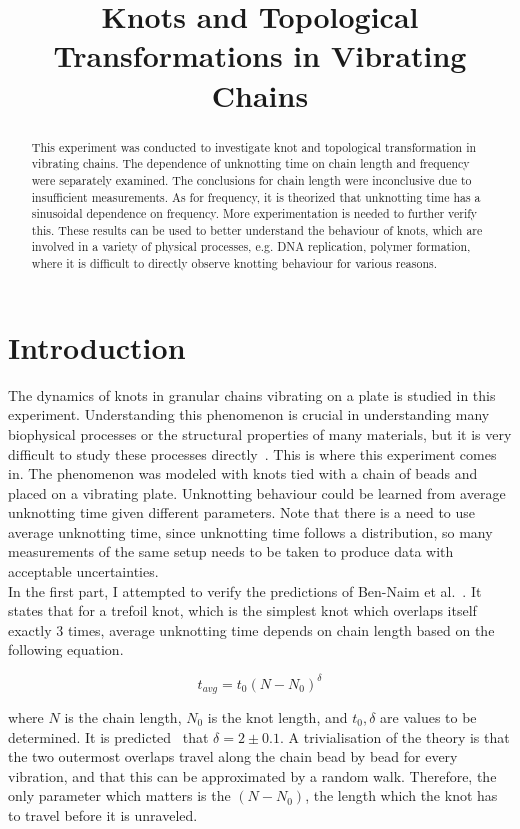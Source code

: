 \documentclass[12pt]{IEEEtran}
\title{Knots and Topological Transformations in Vibrating Chains}
\begin{document}
\maketitle

\begin{abstract}
    This experiment was conducted to investigate knot and topological transformation in vibrating chains. The dependence of unknotting time on chain length and frequency were separately examined. The conclusions for chain length were inconclusive due to insufficient measurements. As for frequency, it is theorized that unknotting time has a sinusoidal dependence on frequency. More experimentation is needed to further verify this. These results can be used to better understand the behaviour of knots, which are involved in a variety of physical processes, e.g. DNA replication, polymer formation, where it is difficult to directly observe knotting behaviour for various reasons.
\end{abstract}

\section{Introduction}

The dynamics of knots in granular chains vibrating on a plate is studied in this experiment. Understanding this phenomenon is crucial in understanding many biophysical processes or the structural properties of many materials, but it is very difficult to study these processes directly~\cite{manual}. This is where this experiment comes in. The phenomenon was modeled with knots tied with a chain of beads and placed on a vibrating plate. Unknotting behaviour could be learned from average unknotting time given different parameters. Note that there is a need to use average unknotting time, since unknotting time follows a distribution, so many measurements of the same setup needs to be taken to produce data with acceptable uncertainties. \\
In the first part, I attempted to verify the predictions of Ben-Naim et al.~\cite{bennaim}. It states that for a trefoil knot, which is the simplest knot which overlaps itself exactly 3 times, average unknotting time depends on chain length based on the following equation.

\begin{equation}
    t_{avg} = t_0(N - N_0)^\delta
\end{equation}

where $N$ is the chain length, $N_0$ is the knot length, and $t_0, \delta$ are values to be determined. It is predicted~\cite{bennaim} that $\delta = 2 \pm 0.1$. A trivialisation of the theory is that the two outermost overlaps travel along the chain bead by bead for every vibration, and that this can be approximated by a random walk. Therefore, the only parameter which matters is the $(N - N_0)$, the length which the knot has to travel before it is unraveled. \\
\end{document}
